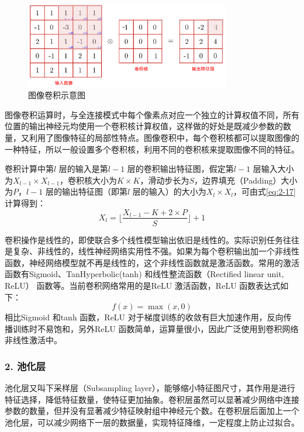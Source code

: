 \begin{figure}[htbp]
  \centering
  \includegraphics[width=0.8\textwidth]{figures/conv_op}
  \caption{图像卷积示意图}\label{fig:conv_op}
\end{figure}

图像卷积运算时，与全连接模式中每个像素点对应一个独立的计算权值不同，所有位置的输出神经元均使用一个卷积核计算权值，这样做的好处是既减少参数的数量，又利用了图像特征的局部性特点。图像卷积中，每个卷积核都可以提取图像的一种特征，所以一般设置多个卷积核，利用不同的卷积核来提取图像不同的特征。

卷积计算中第$l$ 层的输入是第$l-1$ 层的卷积输出特征图，假定第$l-1$ 层输入大小为$X_{l-1} \times X_{l-1}$，卷积核大小为$K \times K$，滑动步长为$S$，边界填充（Padding）大小为$P$，$l-1$ 层的输出特征图（即第$l$ 层的输入）的大小为$X_l \times X_l$，可由式\ref{eq:2-17} 计算得到：
\begin{equation}
  \label{eq:2-17}
  X_l = \lfloor \frac{X_{l-1} - K + 2 \times P}{S} \rfloor + 1
\end{equation}

卷积操作是线性的，即使联合多个线性模型输出依旧是线性的。实际识别任务往往是复杂、非线性的，线性神经网络实用性不强。如果为每个卷积输出加一个非线性函数，神经网络模型就不再是线性的，这个非线性函数就是激活函数。常用的激活函数有Sigmoid、TanHyperbolic(tanh) 和线性整流函数（Rectified linear unit, ReLU） 函数等。当前卷积网络常用的是ReLU 激活函数，ReLU 函数表达式如下：
\begin{equation}
  \label{eq:2-17-1}
  f(x) = \max(x,0)
\end{equation}
相比Sigmoid 和tanh 函数，ReLU 对于梯度训练的收敛有巨大加速作用，反向传播训练时不易饱和，另外ReLU 函数简单，运算量很小，因此广泛使用到卷积网络非线性激活中。

\subsubsection*{2. 池化层}
\label{subsec:chap02-2-1-2}
池化层又叫下采样层（Subsampling layer），能够缩小特征图尺寸，其作用是进行特征选择，降低特征数量，使特征更加抽象。卷积层虽然可以显著减少网络中连接参数的数量，但并没有显著减少特征映射组中神经元个数。在卷积层后面加上一个池化层，可以减少网络下一层的数据量，实现特征降维，一定程度上防止过拟合。

